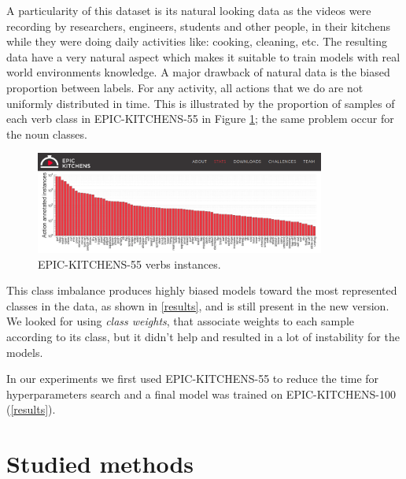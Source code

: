 \documentclass[12pt, a4paper]{report}
\begin{document}
				A particularity of this dataset is its natural looking data as the videos were recording by researchers, engineers, students and other people, in their kitchens while they were doing daily activities like: cooking, cleaning, etc.
				The resulting data have a very natural aspect which makes it suitable to train models with real world environments knowledge.
				A major drawback of natural data is the biased proportion between labels.
				For any activity, all actions that we do are not uniformly distributed in time.
				This is illustrated by the proportion of samples of each verb class in EPIC-KITCHENS-55 in Figure \ref{epic_55_imbalance}; the same problem occur for the noun classes.
				\begin{figure}[h!]
					\centering
					\includegraphics[width=0.85\textwidth]{EPIC-55 data imbalance.png}
					\caption{EPIC-KITCHENS-55 verbs instances.}
					\label{epic_55_imbalance}
				\end{figure}
				This class imbalance produces highly biased models toward the most represented classes in the data, as shown in \ref{results}, and is still present in the new version.
				We looked for using {\itshape class weights}, that associate weights to each sample according to its class, but it didn't help and resulted in a lot of instability for the models.
				\par
				In our experiments we first used EPIC-KITCHENS-55 to reduce the time for hyperparameters search and a final model was trained on EPIC-KITCHENS-100 (\ref{results}).
		\section{Studied methods}
\end{document}
